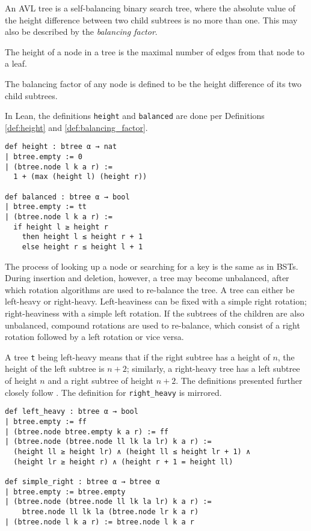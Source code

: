An AVL tree \cite{avl:original} is a self-balancing binary search tree, where the absolute value of the height difference between two child subtrees is no more than one.
This may also be described by the \textit{balancing factor}.

\begin{definition}
  \label{def:height}
  The height of a node in a tree is the maximal number of edges from that node to a leaf.
\end{definition}

\begin{definition}
  \label{def:balancing_factor}
  The balancing factor of any node is defined to be the height difference of its two child subtrees.
\end{definition}

In Lean, the definitions \lstinline{height} and \lstinline{balanced} are done per Definitions \ref{def:height} and \ref{def:balancing_factor}.

\begin{lstlisting}
def height : btree α → nat
| btree.empty := 0
| (btree.node l k a r) :=
  1 + (max (height l) (height r))

def balanced : btree α → bool
| btree.empty := tt
| (btree.node l k a r) :=
  if height l ≥ height r 
    then height l ≤ height r + 1
    else height r ≤ height l + 1
\end{lstlisting}

The process of looking up a node or searching for a key is the same as in BSTs. During insertion and deletion, however, a tree may become unbalanced, after which rotation algorithms are used to re-balance the tree. A tree can either be left-heavy or right-heavy. Left-heaviness can be fixed with a simple right rotation; right-heaviness with a simple left rotation. If the subtrees of the children are also unbalanced, compound rotations are used to re-balance, which consist of a right rotation followed by a left rotation or vice versa.

A tree \lstinline{t} being left-heavy means that if the right subtree has a height of $n$, the height of the left subtree is $n+2$; similarly, a right-heavy tree has a left subtree of height $n$ and a right subtree of height $n+2$. The definitions presented further closely follow \cite{textbook:discrete_computer}. The definition for \lstinline{right_heavy} is mirrored.

\begin{lstlisting}
def left_heavy : btree α → bool
| btree.empty := ff
| (btree.node btree.empty k a r) := ff
| (btree.node (btree.node ll lk la lr) k a r) :=
  (height ll ≥ height lr) ∧ (height ll ≤ height lr + 1) ∧
  (height lr ≥ height r) ∧ (height r + 1 = height ll)

def simple_right : btree α → btree α
| btree.empty := btree.empty
| (btree.node (btree.node ll lk la lr) k a r) := 
    btree.node ll lk la (btree.node lr k a r)
| (btree.node l k a r) := btree.node l k a r
\end{lstlisting}

